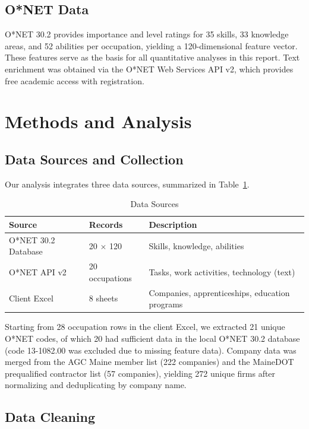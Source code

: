 \documentclass[12pt]{article}
\begin{document}
\subsection{O*NET Data}

O*NET 30.2 provides importance and level ratings for 35 skills,
33 knowledge areas, and 52 abilities per occupation, yielding a
120-dimensional feature vector. These features serve as the
basis for all quantitative analyses in this report. Text
enrichment was obtained via the O*NET Web Services API v2,
which provides free academic access with registration.

\section{Methods and Analysis}

\subsection{Data Sources and Collection}

Our analysis integrates three data sources, summarized in
Table~\ref{tab:datasources}.

\begin{table}[H]
\centering
\caption{Data Sources}
\label{tab:datasources}
\begin{tabular}{lll}
\toprule
\textbf{Source} & \textbf{Records} & \textbf{Description} \\
\midrule
O*NET 30.2 Database & 20 $\times$ 120 & Skills, knowledge, abilities \\
O*NET API v2        & 20 occupations  & Tasks, work activities, technology (text) \\
Client Excel        & 8 sheets        & Companies, apprenticeships, education programs \\
\bottomrule
\end{tabular}
\end{table}

Starting from 28 occupation rows in the client Excel, we
extracted 21 unique O*NET codes, of which 20 had sufficient
data in the local O*NET 30.2 database (code 13-1082.00 was
excluded due to missing feature data). Company data was merged
from the AGC Maine member list (222 companies) and the MaineDOT
prequalified contractor list (57 companies), yielding 272 unique
firms after normalizing and deduplicating by company name.

\subsection{Data Cleaning}
\end{document}
